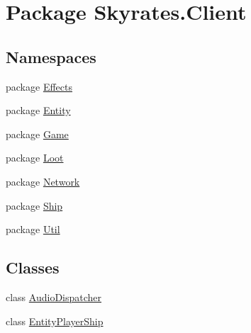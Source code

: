 \hypertarget{namespace_skyrates_1_1_client}{\section{Package Skyrates.\-Client}
\label{namespace_skyrates_1_1_client}
}
\subsection*{Namespaces}
\begin{DoxyCompactItemize}
\item 
package \hyperlink{namespace_skyrates_1_1_client_1_1_effects}{Effects}
\item 
package \hyperlink{namespace_skyrates_1_1_client_1_1_entity}{Entity}
\item 
package \hyperlink{namespace_skyrates_1_1_client_1_1_game}{Game}
\item 
package \hyperlink{namespace_skyrates_1_1_client_1_1_loot}{Loot}
\item 
package \hyperlink{namespace_skyrates_1_1_client_1_1_network}{Network}
\item 
package \hyperlink{namespace_skyrates_1_1_client_1_1_ship}{Ship}
\item 
package \hyperlink{namespace_skyrates_1_1_client_1_1_util}{Util}
\end{DoxyCompactItemize}
\subsection*{Classes}
\begin{DoxyCompactItemize}
\item 
class \hyperlink{class_skyrates_1_1_client_1_1_audio_dispatcher}{Audio\-Dispatcher}
\item 
class \hyperlink{class_skyrates_1_1_client_1_1_entity_player_ship}{Entity\-Player\-Ship}
\end{DoxyCompactItemize}
